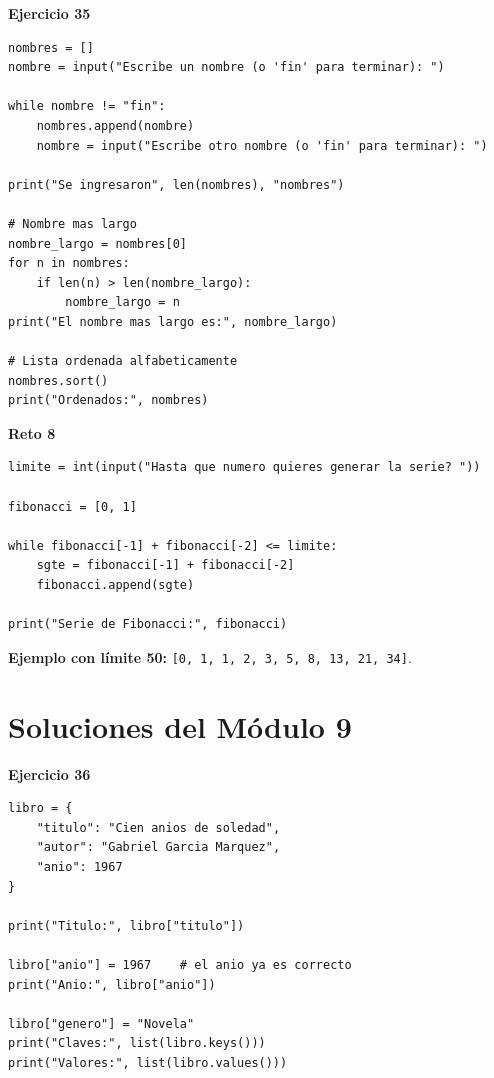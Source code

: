 \documentclass[12pt,a4paper]{article}
\begin{document}
\begin{cajaSolucion}
\textbf{Ejercicio 35}
\begin{lstlisting}[style=pythonStyle]
nombres = []
nombre = input("Escribe un nombre (o 'fin' para terminar): ")

while nombre != "fin":
    nombres.append(nombre)
    nombre = input("Escribe otro nombre (o 'fin' para terminar): ")

print("Se ingresaron", len(nombres), "nombres")

# Nombre mas largo
nombre_largo = nombres[0]
for n in nombres:
    if len(n) > len(nombre_largo):
        nombre_largo = n
print("El nombre mas largo es:", nombre_largo)

# Lista ordenada alfabeticamente
nombres.sort()
print("Ordenados:", nombres)
\end{lstlisting}
\end{cajaSolucion}

\begin{cajaSolucion}
\textbf{Reto 8}
\begin{lstlisting}[style=pythonStyle]
limite = int(input("Hasta que numero quieres generar la serie? "))

fibonacci = [0, 1]

while fibonacci[-1] + fibonacci[-2] <= limite:
    sgte = fibonacci[-1] + fibonacci[-2]
    fibonacci.append(sgte)

print("Serie de Fibonacci:", fibonacci)
\end{lstlisting}

\textbf{Ejemplo con límite 50:} \texttt{[0, 1, 1, 2, 3, 5, 8, 13, 21, 34]}.
\end{cajaSolucion}

\section{Soluciones del Módulo 9}

\begin{cajaSolucion}
\textbf{Ejercicio 36}
\begin{lstlisting}[style=pythonStyle]
libro = {
    "titulo": "Cien anios de soledad",
    "autor": "Gabriel Garcia Marquez",
    "anio": 1967
}

print("Titulo:", libro["titulo"])

libro["anio"] = 1967    # el anio ya es correcto
print("Anio:", libro["anio"])

libro["genero"] = "Novela"
print("Claves:", list(libro.keys()))
print("Valores:", list(libro.values()))
\end{lstlisting}
\end{cajaSolucion}
\end{document}
